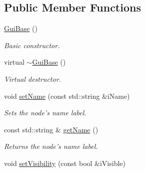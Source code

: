 \subsection*{Public Member Functions}
\begin{DoxyCompactItemize}
\item 
\hypertarget{class_gui_base_a9709f9e456c49c05094e7d2f96fef5f0}{\hyperlink{class_gui_base_a9709f9e456c49c05094e7d2f96fef5f0}{Gui\-Base} ()}\label{class_gui_base_a9709f9e456c49c05094e7d2f96fef5f0}

\begin{DoxyCompactList}\small\item\em Basic constructor. \end{DoxyCompactList}\item 
\hypertarget{class_gui_base_a6ced3adb2ad93c9970ef415eaa5ffecb}{virtual \hyperlink{class_gui_base_a6ced3adb2ad93c9970ef415eaa5ffecb}{$\sim$\-Gui\-Base} ()}\label{class_gui_base_a6ced3adb2ad93c9970ef415eaa5ffecb}

\begin{DoxyCompactList}\small\item\em Virtual destructor. \end{DoxyCompactList}\item 
\hypertarget{class_gui_base_af8f620fb195f78481f1487f98f09373e}{void \hyperlink{class_gui_base_af8f620fb195f78481f1487f98f09373e}{set\-Name} (const std\-::string \&i\-Name)}\label{class_gui_base_af8f620fb195f78481f1487f98f09373e}

\begin{DoxyCompactList}\small\item\em Sets the node's name label. \end{DoxyCompactList}\item 
\hypertarget{class_gui_base_a3108caaa4336deed6a28134d59a5b69b}{const std\-::string \& \hyperlink{class_gui_base_a3108caaa4336deed6a28134d59a5b69b}{get\-Name} ()}\label{class_gui_base_a3108caaa4336deed6a28134d59a5b69b}

\begin{DoxyCompactList}\small\item\em Returns the node's name label. \end{DoxyCompactList}\item 
\hypertarget{class_gui_base_a202171c06ea2331c8d97cb168b950eba}{void \hyperlink{class_gui_base_a202171c06ea2331c8d97cb168b950eba}{set\-Visibility} (const bool \&i\-Visible)}\label{class_gui_base_a202171c06ea2331c8d97cb168b950eba}


\end{DoxyCompactItemize}
